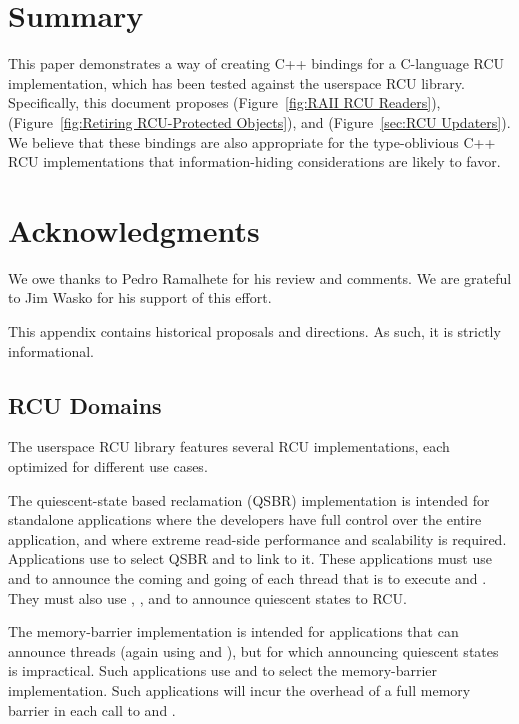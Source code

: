 \documentclass[letterpaper,10pt]{article}
\begin{document}
\section{Summary}
\label{sec:Summary}

This paper demonstrates a way of creating C++ bindings for a C-language
RCU implementation, which has been tested against the userspace RCU
library.
Specifically, this document proposes
 (Figure~\ref{fig:RAII RCU Readers}),
 (Figure~\ref{fig:Retiring RCU-Protected Objects}), and
 (Figure~\ref{sec:RCU Updaters}).
We believe that these bindings are also appropriate for the type-oblivious
C++ RCU implementations that information-hiding considerations are likely
to favor.

\section*{Acknowledgments}

We owe thanks to Pedro Ramalhete for his review and comments.
We are grateful to Jim Wasko for his support of this effort.

%
%

\appendix
\clearpage

This appendix contains historical proposals and directions.
As such, it is strictly informational.

\subsection{RCU Domains}
\label{sec:RCU Domains}

The userspace RCU library features several RCU implementations, each
optimized for different use cases.

The quiescent-state based reclamation (QSBR) implementation is intended
for standalone applications where the developers have full control
over the entire application, and where extreme read-side performance
and scalability is required.
Applications use  to select QSBR and
 to link to it.
These applications must use  and
 to announce the coming and going
of each thread that is to execute  and
.
They must also use , ,
and  to announce quiescent states to RCU.

The memory-barrier implementation is intended for applications that
can announce threads (again using  and
), but for which announcing quiescent states is
impractical.
Such applications use  and
 to select the memory-barrier implementation.
Such applications will incur the overhead of a full memory barrier in
each call to  and .
\end{document}
